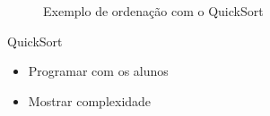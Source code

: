 \begin{frame}{}
	\begin{figure}[h!]
		\centering    
		  \caption{Exemplo de ordenação com o QuickSort \cite{GEEKS_2018}}
	 \end{figure} 
\end{frame}

\begin{frame}
	\begin{block}{QuickSort}
		\begin{itemize}
			\item Programar com os alunos
			\item Mostrar complexidade
		\end{itemize}
	\end{block}
\end{frame}

